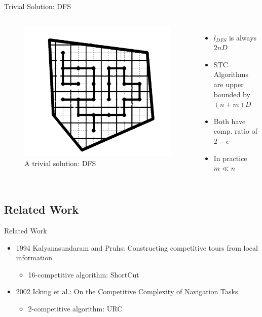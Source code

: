 \documentclass{beamer}
\begin{document}
\begin{frame}{Trivial Solution: DFS}
    \begin{columns}
        \begin{figure}
            \includegraphics[width=\linewidth]{Images/DFS.png}
            \caption{A trivial solution: DFS}
        \end{figure}
        \begin{itemize}
            \item $l_{DFS}$ is always $2nD$
            \item STC Algorithms are upper bounded by $(n + m) D$
            \item Both have comp. ratio of $2 - \epsilon$
            \item In practice $m \ll n$
        \end{itemize}
    \end{columns}
\end{frame}

\subsection{Related Work}
\begin{frame}{Related Work}
    \begin{itemize}
        \item 1994 Kalyanasundaram and Pruhs: Constructing competitive tours from local information
              \begin{itemize}
                  \item 16-competitive algorithm: ShortCut
              \end{itemize}
        \item 2002 Icking et al.: On the Competitive Complexity of Navigation Tasks
              \begin{itemize}
                  \item 2-competitive algorithm: URC
              \end{itemize}
    \end{itemize}
\end{frame}
\end{document}
